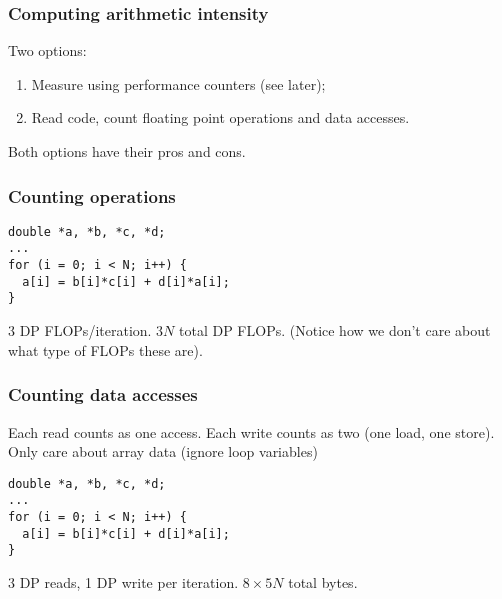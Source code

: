 \documentclass[presentation,aspectratio=43,10pt]{beamer}
\begin{document}
\begin{frame}
  \frametitle{Computing arithmetic intensity}
  Two options:

  \begin{enumerate}
  \item Measure using performance counters (see later);
  \item Read code, count floating point operations and data accesses.
  \end{enumerate}

  Both options have their pros and cons.
\end{frame}
\begin{frame}[fragile]
  \frametitle{Counting operations}
\begin{verbatim}
double *a, *b, *c, *d;
...
for (i = 0; i < N; i++) {
  a[i] = b[i]*c[i] + d[i]*a[i];
}
\end{verbatim}

  3 DP FLOPs/iteration. $3N$ total DP FLOPs. (Notice how we don't care about
  what type of FLOPs these are).
\end{frame}

\begin{frame}[fragile]
  \frametitle{Counting data accesses}
  Each read counts as one access. Each write counts as two (one load,
  one store). Only care about array data (ignore loop variables)
\begin{verbatim}
double *a, *b, *c, *d;
...
for (i = 0; i < N; i++) {
  a[i] = b[i]*c[i] + d[i]*a[i];
}
\end{verbatim}

  3 DP reads, 1 DP write per iteration. $8\times 5N$ total bytes.
\end{frame}
\end{document}
